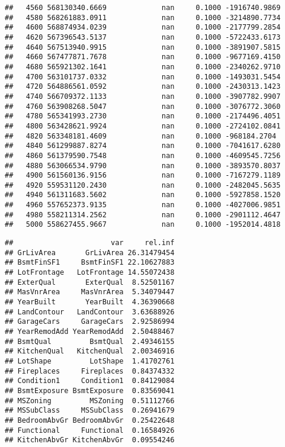 \documentclass[
]{article}
\begin{document}
\begin{verbatim}
##   4560 568130340.6669             nan     0.1000 -1916740.9869
##   4580 568261883.0911             nan     0.1000 -3214890.7734
##   4600 568874934.0239             nan     0.1000 -2177799.2854
##   4620 567396543.5137             nan     0.1000 -5722433.6173
##   4640 567513940.9915             nan     0.1000 -3891907.5815
##   4660 567477871.7678             nan     0.1000 -9677169.4150
##   4680 565921302.1641             nan     0.1000 -2340262.9710
##   4700 563101737.0332             nan     0.1000 -1493031.5454
##   4720 564886561.0592             nan     0.1000 -2430313.1423
##   4740 566709372.1133             nan     0.1000 -3907782.9907
##   4760 563908268.5047             nan     0.1000 -3076772.3060
##   4780 565341993.2730             nan     0.1000 -2174496.4051
##   4800 563428621.9924             nan     0.1000 -2724102.0841
##   4820 563348181.4609             nan     0.1000 -968184.2704
##   4840 561299887.8274             nan     0.1000 -7041617.6280
##   4860 561379590.7548             nan     0.1000 -4609545.7256
##   4880 563066534.9790             nan     0.1000 -3893570.8037
##   4900 561560136.9156             nan     0.1000 -7167279.1189
##   4920 559531120.2430             nan     0.1000 -2482045.5635
##   4940 561311683.5602             nan     0.1000 -5927858.1520
##   4960 557652373.9135             nan     0.1000 -4027006.9851
##   4980 558211314.2562             nan     0.1000 -2901112.4647
##   5000 558627455.9667             nan     0.1000 -1952014.4818
\end{verbatim}

\begin{verbatim}
##                       var     rel.inf
## GrLivArea       GrLivArea 26.31479454
## BsmtFinSF1     BsmtFinSF1 22.10627883
## LotFrontage   LotFrontage 14.55072438
## ExterQual       ExterQual  8.52501167
## MasVnrArea     MasVnrArea  5.34079447
## YearBuilt       YearBuilt  4.36390668
## LandContour   LandContour  3.63688926
## GarageCars     GarageCars  2.92586994
## YearRemodAdd YearRemodAdd  2.50488467
## BsmtQual         BsmtQual  2.49346155
## KitchenQual   KitchenQual  2.00346916
## LotShape         LotShape  1.41702761
## Fireplaces     Fireplaces  0.84374332
## Condition1     Condition1  0.84129084
## BsmtExposure BsmtExposure  0.83569041
## MSZoning         MSZoning  0.51112766
## MSSubClass     MSSubClass  0.26941679
## BedroomAbvGr BedroomAbvGr  0.25422648
## Functional     Functional  0.16584926
## KitchenAbvGr KitchenAbvGr  0.09554246
\end{verbatim}
\end{document}
